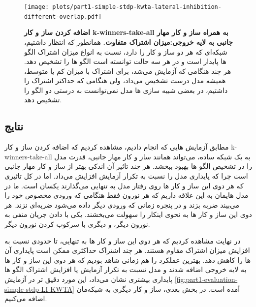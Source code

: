         \begin{figure}[!ht]
            \centering
            \texttt{[image: plots/part1-simple-stdp-kwta-lateral-inhibition-different-overlap.pdf]} 
            \captionsetup{width=.85\linewidth}
            \caption{\textbf{اضافه کردن ساز و کار 
            k-winners-take-all
            به همراه ساز و کار مهار جانبی به لایه خروجی:میزان اشتراک متفاوت. } 
            همانطور که انتظار داشتیم، شبکه‌ای که هر دو ساز و کار را دارد، نسبت به انواع میزان اشتراک الگو ها پایدار است و در هر سه حالت توانسته است الگو ها را تشخیص دهد. هر چند هنگامی که آزمایش می‌شد، برای اشتراک با میزان کم یا متوسط، همیشه مدل درست تشخیص می‌داد، ولی هنگامی که حداکثر اشتراک را داشتیم، در بعضی شبیه سازی ها مدل نمی‌توانست به درستی دو الگو را تشخیص دهد.
            }
            \label{fig:part1-simple-stdp-kwta-lateral-inhibition-different-overlap}
        \end{figure}
        
    \subsection*{نتایج}
        مطابق آزمایش هایی که انجام دادیم، مشاهده کردیم که اضافه کردن ساز و کار 
        k-winners-take-all 
        به یک شبکه ساده، می‌تواند همانند ساز و کار مهار جانبی، قدرت مدل را در تشخیص الگو ها بهبود ببخشد. هر چند تاثیر آن اندکی بهتر از ساز و کار مهار جانبی است چرا که پایداری مدل را نسبت به تکرار آزمایش افزایش می‌داد. اما در کل تاثیری که هر دوی این ساز و کار ها روی رفتار مدل به تنهایی می‌گذارند یکسان است. ما در مدل هایمان به این علاقه داریم که هر نورون فقط هنگامی که ورودی مخصوص خود را می‌بیند ضربه بزند و در پنجره زمانی که ورودی دیگر داده می‌شود ضربه‌ای نزند. هر دوی این ساز و کار ها به نحوی اینکار را سهولت می‌بخشند. یکی با دادن جریان منفی به نورون دیگر، و دیگری با سرکوب کردن نورون دیگر.

        در نهایت مشاهده کردیم که هر دوی این ساز و کار ها به تنهایی، تا حدودی نسبت به افزایش میزان اشتراک مقاوم هستند. هر چند اشتراک حداکثری ممکن است پایداری آن ها را کاهش دهد. بهترین عملکرد را هم زمانی شاهد بودیم که هر دوی این ساز و کار ها به لایه خروجی اضافه شدند و مدل نسبت به تکرار آزمایش یا افزایش اشتراک الگو ها پایداری بیشتری نشان می‌داد، این مورد دقیق تر در آزمایش 
        \ref{fig:part1-evaluation-simple-stdp-LI-KWTA} 
        آمده است. در بخش بعدی، ساز و کار دیگری به شبکه‌مان اضافه می‌کنیم. 

